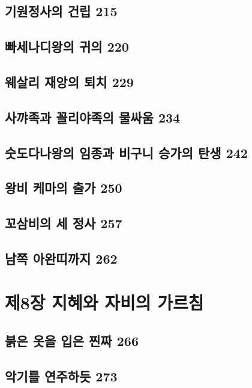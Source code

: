 \documentclass[12pt, a4paper, oneside]{book}
\let\stdsection\section
\renewcommand\section{\newpage\stdsection}
\begin{document}
	\section{기원정사의 건립 215 }

	\section{빠세나디왕의 귀의 220 }

	\section{웨살리 재앙의 퇴치 229 }

	\section{사꺄족과 꼴리야족의 물싸움 234 }

	\section{숫도다나왕의 임종과 비구니 승가의 탄생 242 }

	\section{왕비 케마의 출가 250 }

	\section{꼬삼비의 세 정사 257 }

	\section{남쪽 아완띠까지 262}



	\chapter{제8장 지혜와 자비의 가르침}
	\noptcrule
	\parttoc				


	\section{붉은 옷을 입은 찐짜 266 }

	\section{악기를 연주하듯 273 }
\end{document}
